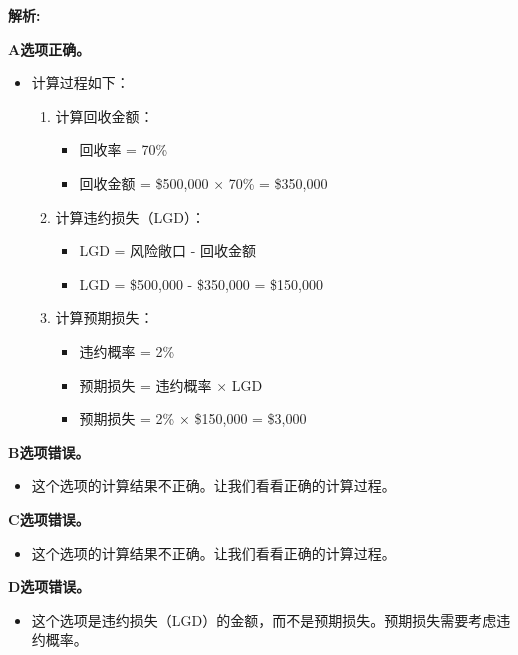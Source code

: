 \documentclass{article}
\newenvironment{explanation}
{\textbf{解析:}\par}
{\par}
\begin{document}
\begin{explanation}
    \textbf{A选项正确。}
    \begin{itemize}
        \item 计算过程如下：
        \begin{enumerate}
            \item 计算回收金额：
            \begin{itemize}
                \item 回收率 = 70\%
                \item 回收金额 = \$500,000 × 70\% = \$350,000
            \end{itemize}
            \item 计算违约损失（LGD）：
            \begin{itemize}
                \item LGD = 风险敞口 - 回收金额
                \item LGD = \$500,000 - \$350,000 = \$150,000
            \end{itemize}
            \item 计算预期损失：
            \begin{itemize}
                \item 违约概率 = 2\%
                \item 预期损失 = 违约概率 × LGD
                \item 预期损失 = 2\% × \$150,000 = \$3,000
            \end{itemize}
        \end{enumerate}
    \end{itemize}
    
    \textbf{B选项错误。}
    \begin{itemize}
        \item 这个选项的计算结果不正确。让我们看看正确的计算过程。
    \end{itemize}
    
    \textbf{C选项错误。}
    \begin{itemize}
        \item 这个选项的计算结果不正确。让我们看看正确的计算过程。
    \end{itemize}
    
    \textbf{D选项错误。}
    \begin{itemize}
        \item 这个选项是违约损失（LGD）的金额，而不是预期损失。预期损失需要考虑违约概率。
    \end{itemize}
\end{explanation}
\end{document}
